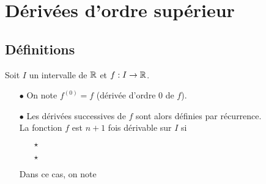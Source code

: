 \documentclass[a4paper, 11pt]{article}
\begin{document}
\section{D\'eriv\'ees d'ordre sup\'erieur}


\subsection{D\'efinitions}


{\noindent

	\begin{defi}
		Soit $I$ un intervalle de $\mathbb{R}$ et $f: I\rightarrow \mathbb{R}$.
		\begin{itemize}
			\item[$\bullet$] On note $f^{(0)}=f$ (d\'eriv\'ee d'ordre 0 de $f$).
			\item[$\bullet$] Les d\'eriv\'ees successives de $f$ sont alors d\'efinies par r\'ecurrence.\\
			      \noindent La fonction $f$ est $n+1$ fois d\'erivable sur $I$ si \vsec
			      \begin{itemize}
				      \item[$\star$]  \dotfill \vsec
				      \item[$\star$] \dotfill \vsec
			      \end{itemize}
			      Dans ce cas, on note \dotfill \vsec
		\end{itemize}
	\end{defi}
}
\vsec\vsec
\end{document}
